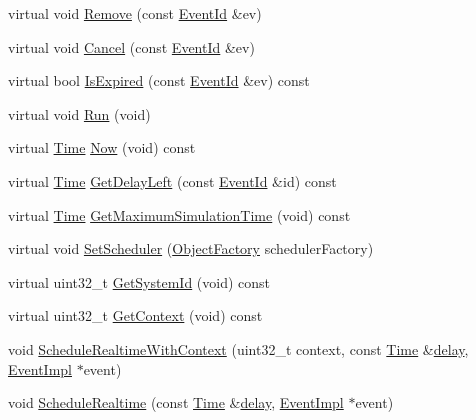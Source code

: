 \begin{DoxyCompactItemize}
\item 
virtual void \hyperlink{classns3_1_1RealtimeSimulatorImpl_a4f28a6a5549bd4aebd5b5d957789c04f}{Remove} (const \hyperlink{classns3_1_1EventId}{Event\+Id} \&ev)
\item 
virtual void \hyperlink{classns3_1_1RealtimeSimulatorImpl_a4cdb32e2c3172bcc68b895664cead954}{Cancel} (const \hyperlink{classns3_1_1EventId}{Event\+Id} \&ev)
\item 
virtual bool \hyperlink{classns3_1_1RealtimeSimulatorImpl_ad371a2231f86a6a81290a0c6e416375d}{Is\+Expired} (const \hyperlink{classns3_1_1EventId}{Event\+Id} \&ev) const 
\item 
virtual void \hyperlink{classns3_1_1RealtimeSimulatorImpl_a5f508debc94903fc12c5a52890c9e839}{Run} (void)
\item 
virtual \hyperlink{classns3_1_1Time}{Time} \hyperlink{classns3_1_1RealtimeSimulatorImpl_a42f8ff0e5c99338d882dbe664ee7fae5}{Now} (void) const 
\item 
virtual \hyperlink{classns3_1_1Time}{Time} \hyperlink{classns3_1_1RealtimeSimulatorImpl_a7d188ec183406882b3633591906e199f}{Get\+Delay\+Left} (const \hyperlink{classns3_1_1EventId}{Event\+Id} \&id) const 
\item 
virtual \hyperlink{classns3_1_1Time}{Time} \hyperlink{classns3_1_1RealtimeSimulatorImpl_ae953042a2e0dcd7b08fc548cb7d1ced6}{Get\+Maximum\+Simulation\+Time} (void) const 
\item 
virtual void \hyperlink{classns3_1_1RealtimeSimulatorImpl_a78a2ca944f07e650018ce86c71986b3e}{Set\+Scheduler} (\hyperlink{classns3_1_1ObjectFactory}{Object\+Factory} scheduler\+Factory)
\item 
virtual uint32\+\_\+t \hyperlink{classns3_1_1RealtimeSimulatorImpl_a09bf288150a5506697b0b5c1cacfefee}{Get\+System\+Id} (void) const 
\item 
virtual uint32\+\_\+t \hyperlink{classns3_1_1RealtimeSimulatorImpl_a5c636fbd1266e28b69cf5f7896f72c9f}{Get\+Context} (void) const 
\item 
void \hyperlink{classns3_1_1RealtimeSimulatorImpl_aa1b515c0e2a8a28495375c45e3eb579b}{Schedule\+Realtime\+With\+Context} (uint32\+\_\+t context, const \hyperlink{classns3_1_1Time}{Time} \&\hyperlink{mmwave_2model_2fading-traces_2fading__trace__generator_8m_a7964e6aa8f61a9d28973c8267a606ad8}{delay}, \hyperlink{classns3_1_1EventImpl}{Event\+Impl} $\ast$event)
\item 
void \hyperlink{classns3_1_1RealtimeSimulatorImpl_a06c825f23ff29bf9fe72652f8fd3b72f}{Schedule\+Realtime} (const \hyperlink{classns3_1_1Time}{Time} \&\hyperlink{mmwave_2model_2fading-traces_2fading__trace__generator_8m_a7964e6aa8f61a9d28973c8267a606ad8}{delay}, \hyperlink{classns3_1_1EventImpl}{Event\+Impl} $\ast$event)

\end{DoxyCompactItemize}
